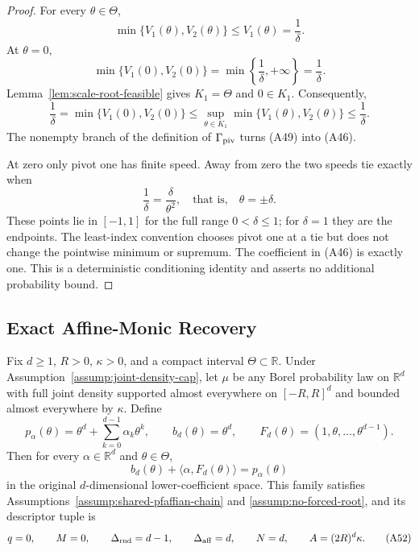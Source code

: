 \begin{proof}
For every $\theta\in\Theta$,
\[
\min\{V_1(\theta),V_2(\theta)\}
\leq V_1(\theta)=\frac1\delta.
\tag{A47}
\]
At $\theta=0$,
\[
\min\{V_1(0),V_2(0)\}
=\min\left\{\frac1\delta,+\infty\right\}
=\frac1\delta.
\tag{A48}
\]
Lemma~\ref{lem:scale-root-feasible} gives $K_1=\Theta$ and $0\in K_1$.
Consequently,
\[
\frac1\delta
=\min\{V_1(0),V_2(0)\}
\leq\sup_{\theta\in K_1}\min\{V_1(\theta),V_2(\theta)\}
\leq\frac1\delta.
\tag{A49}
\]
The nonempty branch of the definition of $\Gamma_{\rm piv}$ turns
\textup{(A49)} into \textup{(A46)}.

At zero only pivot one has finite speed.  Away from zero the two speeds tie
exactly when
\[
\frac1\delta=\frac\delta{\theta^2},
\quad\text{that is,}\quad\theta=\pm\delta.
\]
These points lie in $[-1,1]$ for the full range $0<\delta\leq1$; for
$\delta=1$ they are the endpoints.  The least-index convention chooses
pivot one at a tie but does not change the pointwise minimum or supremum.
The coefficient in \textup{(A46)} is exactly one.  This is a deterministic
conditioning identity and asserts no additional probability bound.
\end{proof}

\subsection{Exact Affine-Monic Recovery}

\begin{proposition}
\label{prop:monic-presentation}
Fix $d\geq1$, $R>0$, $\kappa>0$, and a compact interval
$\Theta\subset\mathbb R$.  Under Assumption~\ref{assump:joint-density-cap},
let $\mu$ be any Borel probability law on $\mathbb R^d$ with full joint
density supported almost everywhere on $[-R,R]^d$ and bounded almost
everywhere by $\kappa$.  Define
\[
p_\alpha(\theta)=\theta^d+\sum_{k=0}^{d-1}\alpha_k\theta^k,
\qquad
b_d(\theta)=\theta^d,
\qquad
F_d(\theta)=(1,\theta,\ldots,\theta^{d-1}).
\tag{A50}
\]
Then for every $\alpha\in\mathbb R^d$ and $\theta\in\Theta$,
\[
b_d(\theta)+\langle\alpha,F_d(\theta)\rangle=p_\alpha(\theta)
\tag{A51}
\]
in the original $d$-dimensional lower-coefficient space.  This family
satisfies Assumptions~\ref{assump:shared-pfaffian-chain} and
\ref{assump:no-forced-root}, and its descriptor tuple is
\[
q=0,
\qquad M=0,
\qquad\Delta_{\rm rnd}=d-1,
\qquad\Delta_{\rm aff}=d,
\qquad N=d,
\qquad A=(2R)^d\kappa.
\tag{A52}
\]
\end{proposition}

